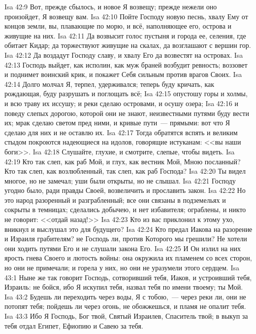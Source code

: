 \vs Isa 42:9 Вот,  прежде сбылось, и новое Я возвещу; прежде нежели оно произойдет, Я возвещу вам.
\vs Isa 42:10 Пойте Господу новую песнь, хвалу Ему от концов земли, вы, плавающие по морю, и всё, наполняющее его, острова и живущие на них.
\vs Isa 42:11 Да возвысит голос пустыня и города ее, селения, где обитает Кидар; да торжествуют живущие на скалах, да возглашают с вершин гор.
\vs Isa 42:12 Да воздадут Господу славу, и хвалу Его да возвестят на островах.
\vs Isa 42:13 Господь выйдет, как исполин, как муж браней возбудит ревность; воззовет и поднимет воинский крик, и покажет Себя сильным против врагов Своих.
\vs Isa 42:14 Долго молчал Я, терпел, удерживался; теперь буду кричать, как рождающая, буду разрушать и поглощать всё;
\vs Isa 42:15 опустошу горы и холмы, и всю траву их иссушу; и реки сделаю островами, и осушу озера;
\vs Isa 42:16 и поведу слепых дорогою, которой они не знают, неизвестными путями буду вести их; мрак сделаю светом пред ними, и кривые пути~--- прямыми: вот что Я сделаю для них и не оставлю их.
\vs Isa 42:17 Тогда обратятся вспять и великим стыдом покроются надеющиеся на идолов, говорящие истуканам: <<вы наши боги>>.
\rsbpar\vs Isa 42:18 Слушайте, глухие, и смотрите, слепые, чтобы видеть.
\vs Isa 42:19 Кто так слеп, как раб Мой, и глух, как вестник Мой, Мною посланный? Кто так слеп, как возлюбленный, так слеп, как раб Господа?
\vs Isa 42:20 Ты видел многое, но не замечал; уши были открыты, но не слышал.
\vs Isa 42:21 Господу угодно было, ради правды Своей, возвеличить и прославить закон.
\vs Isa 42:22 Но это народ разоренный и разграбленный; все они связаны в подземельях и сокрыты в темницах; сделались добычею, и нет избавителя; ограблены, и никто не говорит: <<отдай назад!>>
\vs Isa 42:23 Кто из вас приклонил к этому ухо, вникнул и выслушал это для будущего?
\vs Isa 42:24 Кто предал Иакова на разорение и Израиля грабителям? не Господь ли, против Которого мы грешили? Не хотели они ходить путями Его и не слушали закона Его.
\vs Isa 42:25 И Он излил на них ярость гнева Своего и лютость войны: она окружила их пламенем со всех сторон, но они не примечали; и горела у них, но они не уразумели этого сердцем.
\vs Isa 43:1 Ныне же так говорит Господь, сотворивший тебя, Иаков, и устроивший тебя, Израиль: не бойся, ибо Я искупил тебя, назвал тебя по имени твоему; ты Мой.
\vs Isa 43:2 Будешь ли переходить через воды, Я с тобою,~--- через реки ли, они не потопят тебя; пойдешь ли через огонь, не обожжешься, и пламя не опалит тебя.
\vs Isa 43:3 Ибо Я Господь, Бог твой, Святый Израилев, Спаситель твой; в выкуп за тебя отдал Египет, Ефиопию и Савею за тебя.
